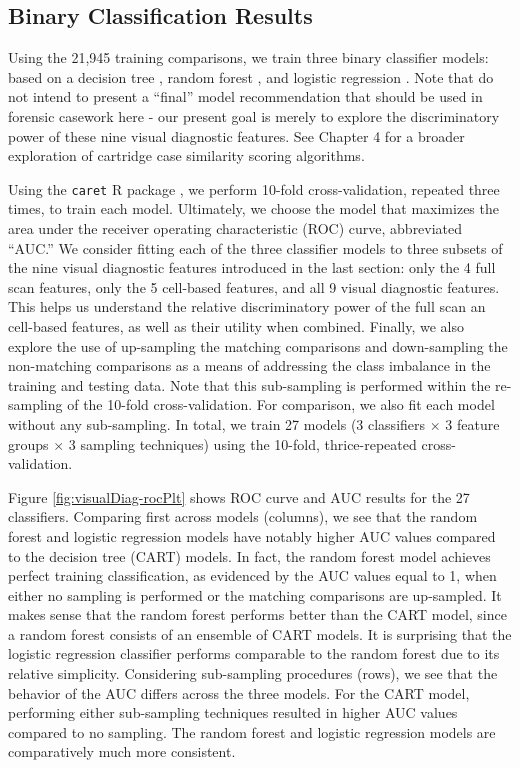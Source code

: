 \documentclass[11pt,]{isuthesis}
\begin{document}
\hypertarget{binary-classification-results}{%
\subsection{Binary Classification Results}\label{binary-classification-results}}

Using the 21,945 training comparisons, we train three binary classifier models: based on a decision tree \citep{Breiman2017, rpart}, random forest \citep{breiman, randomForest}, and logistic regression \citep{stats}.
Note that do not intend to present a ``final'' model recommendation that should be used in forensic casework here - our present goal is merely to explore the discriminatory power of these nine visual diagnostic features.
See Chapter 4 for a broader exploration of cartridge case similarity scoring algorithms.

Using the \texttt{caret} R package \citep{caret}, we perform 10-fold cross-validation, repeated three times, to train each model.
Ultimately, we choose the model that maximizes the area under the receiver operating characteristic (ROC) curve, abbreviated ``AUC.''
We consider fitting each of the three classifier models to three subsets of the nine visual diagnostic features introduced in the last section: only the 4 full scan features, only the 5 cell-based features, and all 9 visual diagnostic features.
This helps us understand the relative discriminatory power of the full scan an cell-based features, as well as their utility when combined.
Finally, we also explore the use of up-sampling the matching comparisons and down-sampling the non-matching comparisons as a means of addressing the class imbalance in the training and testing data.
Note that this sub-sampling is performed within the re-sampling of the 10-fold cross-validation.
For comparison, we also fit each model without any sub-sampling.
In total, we train 27 models (3 classifiers \(\times\) 3 feature groups \(\times\) 3 sampling techniques) using the 10-fold, thrice-repeated cross-validation.

Figure \ref{fig:visualDiag-rocPlt} shows ROC curve and AUC results for the 27 classifiers.
Comparing first across models (columns), we see that the random forest and logistic regression models have notably higher AUC values compared to the decision tree (CART) models.
In fact, the random forest model achieves perfect training classification, as evidenced by the AUC values equal to 1, when either no sampling is performed or the matching comparisons are up-sampled.
It makes sense that the random forest performs better than the CART model, since a random forest consists of an ensemble of CART models.
It is surprising that the logistic regression classifier performs comparable to the random forest due to its relative simplicity.
Considering sub-sampling procedures (rows), we see that the behavior of the AUC differs across the three models.
For the CART model, performing either sub-sampling techniques resulted in higher AUC values compared to no sampling.
The random forest and logistic regression models are comparatively much more consistent.
\end{document}
